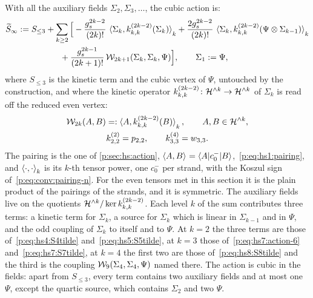 With all the auxiliary fields $\Sigma_2, \Sigma_3, \ldots$, the cubic action is:
  \begin{equation}
  \label{p:eq:all:action}
  \begin{aligned}
    \caction[\infty]
      &
      := S_{\le 3}
        + \sum_{k \ge 2} \Big[
          - \frac{\gs^{2 k - 2}}{(2 k)!} \, \pair[k]{\Sigma_k}{\kin{k}{}{2 k - 2}(\Sigma_k)}
          + \frac{2 \gs^{2 k - 2}}{(2 k)!} \, \pair[k]{\Sigma_k}{\kin{k}{}{2 k - 2}(\Psi \otimes \Sigma_{k - 1})}
      \\ &
      \qquad\qquad\quad
          + \frac{\gs^{2 k - 1}}{(2 k + 1)!} \, \dvertex{2 k + 1}(\Sigma_k, \Sigma_k, \Psi)
        \Big],
    \qquad
    \Sigma_1
      := \Psi,
  \end{aligned}
\end{equation}
where $S_{\le 3}$ is the kinetic term and the cubic vertex of $\Psi$, untouched by the construction, and where the kinetic operator $\kin{k}{}{2 k - 2} \colon \Hn{k} \to \Hn{k}$ of $\Sigma_k$ is read off the reduced even vertex:
\begin{equation}
  \label{p:eq:all:kinetic}
  \begin{gathered}
    \dvertex{2 k}(A, B)
      =: \pair[k]{A}{\kin{k}{}{2 k - 2}(B)},
    \qquad
    A, B \in \Hn{k},
    \\
    \kin{2}{}{2}
      = \sprod{2}{2},
    \qquad
    \kin{3}{}{4}
      = \wprod{3}{3}.
  \end{gathered}
\end{equation}
The pairing is the one of \cref{p:sec:hs:action}, $\pair{A}{B} = \braket{A | c_0^- | B}$,~\eqref{p:eq:hs1:pairing}, and $\pair[k]{\cdot}{\cdot}$ is its $k$-th tensor power, one $c_0^-$ per strand, with the Koszul sign of~\eqref{p:eq:conv:pairing-n}.
For the even tensors met in this section it is the plain product of the pairings of the strands, and it is symmetric.
The auxiliary fields live on the quotients $\Hn{k} / \ker \kin{k}{}{2 k - 2}$.
Each level $k$ of the sum contributes three terms: a kinetic term for $\Sigma_k$, a source for $\Sigma_k$ which is linear in $\Sigma_{k - 1}$ and in $\Psi$, and the odd coupling of $\Sigma_k$ to itself and to $\Psi$.
At $k = 2$ the three terms are those of~\eqref{p:eq:hs4:S4tilde} and~\eqref{p:eq:hs5:S5tilde}, at $k = 3$ those of~\eqref{p:eq:hs7:action-6} and~\eqref{p:eq:hs7:S7tilde}, at $k = 4$ the first two are those of~\eqref{p:eq:hs8:S8tilde} and the third is the coupling $\dvertex{9}(\Sigma_4, \Sigma_4, \Psi)$ named there.
The action is cubic in the fields: apart from $S_{\le 3}$, every term contains two auxiliary fields and at most one $\Psi$, except the quartic source, which contains $\Sigma_2$ and two $\Psi$.

